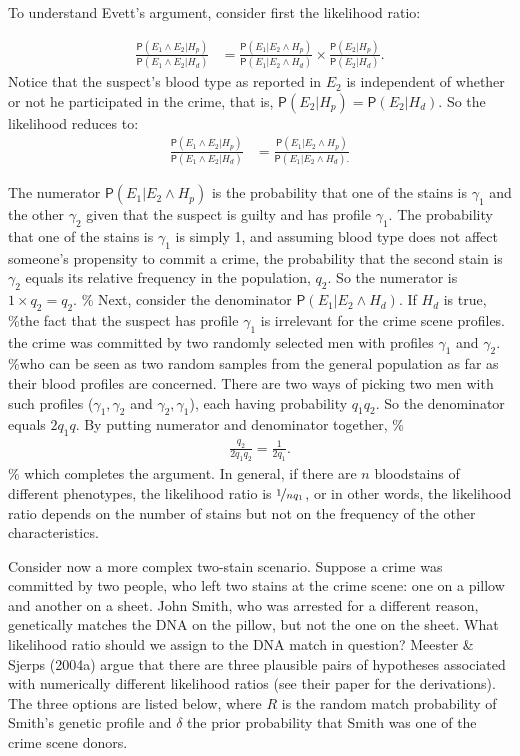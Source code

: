 \documentclass[10pt,dvipsnames,enabledeprecatedfontcommands]{scrartcl}
\newcommand{\pr}[1]{\mathsf{P}(#1)}
\begin{document}
To understand Evett's argument, consider first the likelihood ratio:

\begin{align*}
\frac{\pr{E_1\wedge E_2\vert H_p}}{
    \pr{E_1\wedge E_2\vert H_d}} & = \frac{\pr{E_1 \vert E_2 \wedge H_p}}{
    \pr{E_1 \vert E_2 \wedge H_d}
    }\times 
 \frac{\pr{E_2\vert H_p}}{\pr{E_2 \vert H_d}}. 
 \end{align*} \noindent Notice that the suspect's blood type as reported
in \(E_2\) is independent of whether or not he participated in the
crime, that is, \(\pr{E_2\vert H_p}=\pr{E_2 \vert H_d}\). So the
likelihood reduces to: \begin{align*}
 \frac{\pr{E_1\wedge E_2\vert H_p}}{
    \pr{E_1\wedge E_2\vert H_d}} & = \frac{\pr{E_1 \vert E_2 \wedge H_p}}{
    \pr{E_1 \vert E_2 \wedge H_d}.
 } 
 \end{align*}

\noindent The numerator \(\pr{E_1 \vert E_2 \wedge H_p}\) is the
probability that one of the stains is \(\gamma_1\) and the other
\(\gamma_2\) given that the suspect is guilty and has profile
\(\gamma_1\). The probability that one of the stains is \(\gamma_1\) is
simply 1, and assuming blood type does not affect someone's propensity
to commit a crime, the probability that the second stain is \(\gamma_2\)
equals its relative frequency in the population, \(q_2\). So the
numerator is \(1\times q_2 = q_2\). \% Next, consider the denominator
\(\pr{E_1 \vert E_2 \wedge H_d}\). If \(H_d\) is true, \%the fact that
the suspect has profile \(\gamma_1\) is irrelevant for the crime scene
profiles. the crime was committed by two randomly selected men with
profiles \(\gamma_1\) and \(\gamma_2\). \%who can be seen as two random
samples from the general population as far as their blood profiles are
concerned. There are two ways of picking two men with such profiles
(\(\gamma_1,\gamma_2\) and \(\gamma_2,\gamma_1\)), each having
probability \(q_1q_2\). So the denominator equals \(2q_1q\). By putting
numerator and denominator together, \% \begin{align*}
 \frac{q_2}{2q_1q_2} = \frac{1}{2q_1}. 
 \end{align*} \% \noindent which completes the argument. In general, if
there are \(n\) bloodstains of different phenotypes, the likelihood
ratio is \(\nicefrac{1}{nq_1}\), or in other words, the likelihood ratio
depends on the number of stains but not on the frequency of the other
characteristics.

Consider now a more complex two-stain scenario. Suppose a crime was
committed by two people, who left two stains at the crime scene: one on
a pillow and another on a sheet. John Smith, who was arrested for a
different reason, genetically matches the DNA on the pillow, but not the
one on the sheet. What likelihood ratio should we assign to the DNA
match in question? Meester \& Sjerps (2004a) argue that there are three
plausible pairs of hypotheses associated with numerically different
likelihood ratios (see their paper for the derivations). The three
options are listed below, where \(R\) is the random match probability of
Smith's genetic profile and \(\delta\) the prior probability that Smith
was one of the crime scene donors.
\end{document}
